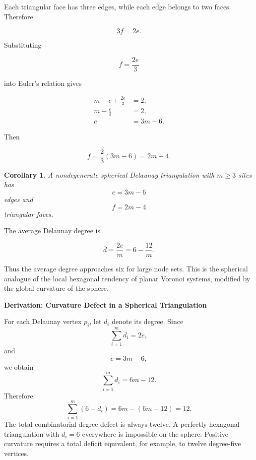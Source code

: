 \documentclass[11pt,fleqn]{book}
\numberwithin{equation}{chapter}
\newenvironment{derivation}[1]
  {\begin{derivationEnv}
   \noindent\textbf{Derivation: #1}\par\smallskip}
  {\end{derivationEnv}}
\theoremstyle{plain}
\newtheorem{corollary}[theorem]{Corollary}
\theoremstyle{definition}
\theoremstyle{remark}
\begin{document}
Each triangular face has three edges, while each edge belongs to two faces. Therefore

\begin{equation}
    3f=2e.
\end{equation}

Substituting

\begin{equation}
    f=\frac{2e}{3}
\end{equation}

into Euler's relation gives

\begin{align}
m-e+\frac{2e}{3}
&=2,
\\
m-\frac{e}{3}
&=2,
\\
e
&=3m-6.
\end{align}

Then

\begin{equation}
    f
    =
    \frac{2}{3}(3m-6)
    =
    2m-4.
\end{equation}

\begin{corollary}
A nondegenerate spherical Delaunay triangulation with \(m\geq 3\) sites has
\[
e=3m-6
\]
edges and
\[
f=2m-4
\]
triangular faces.
\end{corollary}

The average Delaunay degree is

\begin{equation}
    \overline d
    =
    \frac{2e}{m}
    =
    6-\frac{12}{m}.
\end{equation}

Thus the average degree approaches six for large node sets. This is the spherical analogue of the local hexagonal tendency of planar Voronoi systems, modified by the global curvature of the sphere.

\begin{derivation}{Curvature Defect in a Spherical Triangulation}
For each Delaunay vertex \(p_i\), let \(d_i\) denote its degree. Since
\[
\sum_{i=1}^{m}d_i=2e,
\]
and
\[
e=3m-6,
\]
we obtain
\[
\sum_{i=1}^{m}d_i
=
6m-12.
\]
Therefore
\[
\sum_{i=1}^{m}(6-d_i)
=
6m-(6m-12)
=
12.
\]
The total combinatorial degree defect is always twelve. A perfectly hexagonal triangulation with \(d_i=6\) everywhere is impossible on the sphere. Positive curvature requires a total deficit equivalent, for example, to twelve degree-five vertices.
\end{derivation}
\end{document}
